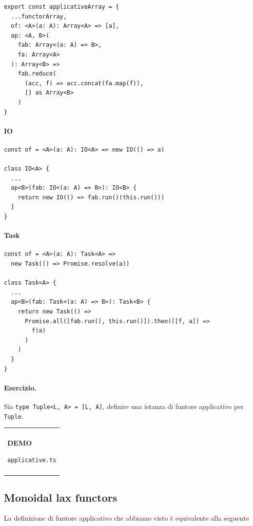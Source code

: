 \documentclass[12pt]{article}
\newenvironment{demo}
    {\begin{center}
    \begin{tabular}{|p{0.9\textwidth}|}
    \hline\\
    }
    {
    \\\\\hline
    \end{tabular}
    \end{center}
    }
\begin{document}
\begin{verbatim}
export const applicativeArray = {
  ...functorArray,
  of: <A>(a: A): Array<A> => [a],
  ap: <A, B>(
    fab: Array<(a: A) => B>,
    fa: Array<A>
  ): Array<B> =>
    fab.reduce(
      (acc, f) => acc.concat(fa.map(f)),
      [] as Array<B>
    )
}
\end{verbatim}

\paragraph{IO}

\begin{verbatim}
const of = <A>(a: A): IO<A> => new IO(() => a)

class IO<A> {
  ...
  ap<B>(fab: IO<(a: A) => B>): IO<B> {
    return new IO(() => fab.run()(this.run()))
  }
}
\end{verbatim}

\paragraph{Task}

\begin{verbatim}
const of = <A>(a: A): Task<A> =>
  new Task(() => Promise.resolve(a))

class Task<A> {
  ...
  ap<B>(fab: Task<(a: A) => B>): Task<B> {
    return new Task(() =>
      Promise.all([fab.run(), this.run()]).then(([f, a]) =>
        f(a)
      )
    )
  }
}
\end{verbatim}

\paragraph{Esercizio. } Sia \texttt{type Tuple<L, A> = [L, A]}, definire una istanza di funtore applicativo per \texttt{Tuple}.

\begin{demo}
\begin{center}
\textbf{DEMO}

\texttt{applicative.ts}
\end{center}
\end{demo}

\subsection{Monoidal lax functors}

La definizione di funtore applicativo che abbiamo visto è equivalente alla seguente
\end{document}
